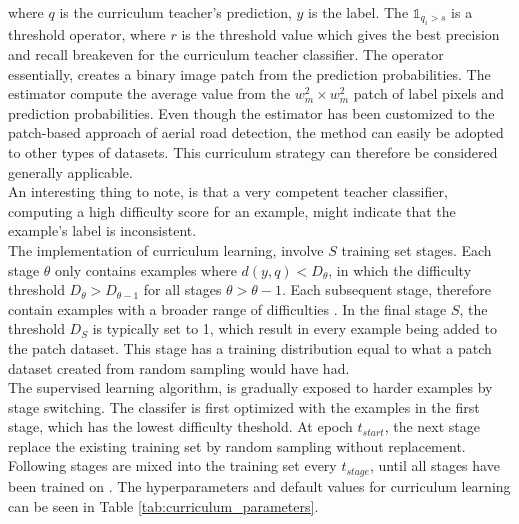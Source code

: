  
\noindent where $q$ is the curriculum teacher's prediction, $y$ is the label. The $\mathbb{1}_{q_i > s}$ is a threshold operator, where $r$ is the threshold value which gives the best precision and recall breakeven for the curriculum teacher classifier. The operator essentially, creates a binary image patch from the prediction probabilities. The estimator compute the average value from the $w_m^2 \times w_m^2$ patch of label pixels and prediction probabilities. Even though the estimator has been customized to the patch-based approach of aerial road detection, the method can easily be adopted to other types of datasets. This curriculum strategy can therefore be considered generally applicable.\\

An interesting thing to note, is that a very competent teacher classifier, computing a high difficulty score for an example, might indicate that the example's label is inconsistent.   \\

The implementation of curriculum learning, involve $S$ training set stages. Each stage $\theta$ only contains examples where $d(y, q) < D_{\theta}$, in which the difficulty threshold $ D_{\theta} > D_{\theta -1}$ for all stages $ \theta > \theta -1$. Each subsequent stage, therefore contain examples with a broader range of difficulties . In the final stage $S$, the threshold $D_{S}$ is typically set to 1, which result in every example being added to the patch dataset. This stage has a training distribution equal to what a patch dataset created from random sampling would have had.  \\

The supervised learning algorithm, is gradually exposed to harder examples by stage switching. The classifer is first optimized with the examples in the first stage, which has the lowest difficulty theshold. At epoch $t_{start}$, the next stage replace the existing training set by random sampling without replacement. Following stages are mixed into the training set every $t_{stage}$, until all stages have been trained on . The hyperparameters and default values for curriculum learning can be seen in Table \ref{tab:curriculum_parameters}. \\

